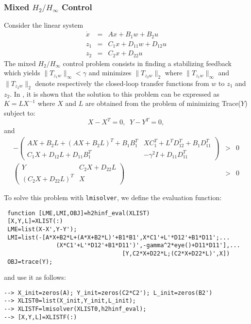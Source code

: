 \documentclass{article}
\begin{document}
\subsubsection{Mixed $H_2/H_{\infty}$ Control}
Consider the linear system
\begin{eqnarray*}
\dot{x}&=&Ax+B_1w+B_2u\\
z_1&=&C_1x+D_{11}w+D_{12}u\\
z_2&=&C_2x+D_{22}u
\end{eqnarray*}
The mixed $H_2/H_{\infty}$ control problem consists in finding
a stabilizing feedback which yields $\|T_{z_1w}\|_{\infty}<\gamma$ and
minimizes $\|T_{z_2w}\|_2$ where $\|T_{z_1w}\|_{\infty}$ and
$\|T_{z_2w}\|_2$ denote respectively the closed-loop transfer
functions from $w$ to $z_1$ and $z_2$. In \cite{khargo}, it is
shown that the solution to this problem can be expressed as
$K=LX^{-1}$ where $X$ and $L$ are obtained from the problem of
minimizing Trace($Y$) subject to:
\[
X-X^T=0,\;\; Y-Y^T=0,
\]
and
\begin{eqnarray*}
-\left( \begin{array} {cc}
AX+B_2L+(AX+B_2L)^T+B_1B_1^T & XC_1^T+L^TD_{12}^T+B_1D_{11}^T \\
C_1X+D_{12}L+D_{11}B_1^T & -\gamma^2 I + D_{11}D_{11}^T
\end{array} \right) & > & 0 \\
\left( \begin{array} {cc}Y & C_2X+D_{22}L\\(C_2X+D_{22}L)^T&X
\end{array} \right) & > & 0
\end{eqnarray*}

To solve this problem with {\tt lmisolver}, we define the 
evaluation function:
\begin{verbatim}
 function [LME,LMI,OBJ]=h2hinf_eval(XLIST)
 [X,Y,L]=XLIST(:)
 LME=list(X-X',Y-Y');
 LMI=list(-[A*X+B2*L+(A*X+B2*L)'+B1*B1',X*C1'+L'*D12'+B1*D11';...
               (X*C1'+L'*D12'+B1*D11')',-gamma^2*eye()+D11*D11'],...
                                  [Y,C2*X+D22*L;(C2*X+D22*L)',X])
 OBJ=trace(Y);
\end{verbatim}
and use it as follows:
\begin{verbatim}
--> X_init=zeros(A); Y_init=zeros(C2*C2'); L_init=zeros(B2')
--> XLIST0=list(X_init,Y_init,L_init);
--> XLISTF=lmisolver(XLIST0,h2hinf_eval);
--> [X,Y,L]=XLISTF(:)
\end{verbatim}
\end{document}
